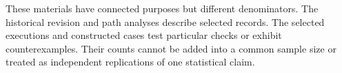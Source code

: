 These materials have connected purposes but different denominators. The historical revision and path analyses describe selected records. The selected executions and constructed cases test particular checks or exhibit counterexamples. Their counts cannot be added into a common sample size or treated as independent replications of one statistical claim.

